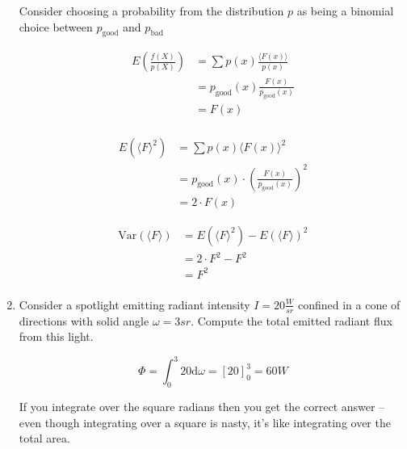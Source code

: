 \documentclass[10pt,\jkfside,a4paper]{article}
\begin{document}
\begin{enumerate}
Consider choosing a probability from the distribution $p$ as being a
binomial choice between $p_{\text{good}}$ and $p_{\text{bad}}$

\[
\begin{split}
E \left(\frac{f(X)}{p(X)}\right)
&= \sum p(x) \frac{\langle F(x) \rangle}{p(x)} \\
&= p_{\text{good}}(x) \frac{F(x)}{p_{\text{good}}(x)} \\
&= F(x) \\
\end{split}
\]

\[
\begin{split}
E\left( \langle F \rangle^2 \right)
&= \sum p(x) \langle F(x) \rangle^2 \\
&= p_{\text{good}}(x) \cdot \left(\frac{F(x)}{p_{\text{good}}(x)}\right)^2 \\
&= 2 \cdot F(x)
\end{split}
\]

\[
\begin{split}
\text{Var}(\langle F \rangle) &= E(\langle F \rangle^2) - E(\langle F
\rangle)^2 \\
&= 2 \cdot F^2 - F^2 \\
&= F^2 \\
\end{split}
\]

\item Consider a spotlight emitting radiant intensity $I = 20\frac{W}{sr}$
confined in a cone of directions with solid angle $\omega = 3 sr$. Compute
the total emitted radiant flux from this light.

\[
\Phi = \int^3_0 20\text{d}\omega = \left[20\right]^3_0 = 60W
\]

{\color{blue}
If you integrate over the square radians then you get the correct answer --
even though integrating over a square is nasty, it's like integrating over
the total area.
}

\end{enumerate}
\end{document}
